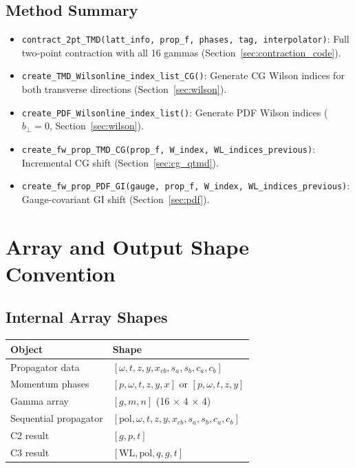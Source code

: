 \documentclass[11pt,a4paper]{article}
\begin{document}
\subsection{Method Summary}

\begin{itemize}
  \item \texttt{contract\_2pt\_TMD(latt\_info, prop\_f, phases, tag, interpolator)}:
    Full two-point contraction with all 16 gammas (Section~\ref{sec:contraction_code}).
  \item \texttt{create\_TMD\_Wilsonline\_index\_list\_CG()}:
    Generate CG Wilson indices for both transverse directions (Section~\ref{sec:wilson}).
  \item \texttt{create\_PDF\_Wilsonline\_index\_list()}:
    Generate PDF Wilson indices ($b_\perp = 0$, Section~\ref{sec:wilson}).
  \item \texttt{create\_fw\_prop\_TMD\_CG(prop\_f, W\_index, WL\_indices\_previous)}:
    Incremental CG shift (Section~\ref{sec:cg_qtmd}).
  \item \texttt{create\_fw\_prop\_PDF\_GI(gauge, prop\_f, W\_index, WL\_indices\_previous)}:
    Gauge-covariant GI shift (Section~\ref{sec:pdf}).
\end{itemize}

\section{Array and Output Shape Convention}
\label{sec:output}

\subsection{Internal Array Shapes}

\begin{center}
  \begin{tabular}{l|l}
    Object & Shape \\
    \hline
    Propagator data & $[\omega, t, z, y, x_{cb}, s_a, s_b, c_a, c_b]$ \\
    Momentum phases & $[p, \omega, t, z, y, x]$ or $[p, \omega, t, z, y]$ \\
    Gamma array & $[g, m, n]$ (16 $\times$ 4 $\times$ 4) \\
    Sequential propagator & $[\text{pol}, \omega, t, z, y, x_{cb}, s_a, s_b, c_a, c_b]$ \\
    C2 result & $[g, p, t]$ \\
    C3 result & $[\text{WL}, \text{pol}, q, g, t]$
  \end{tabular}
\end{center}
\end{document}
